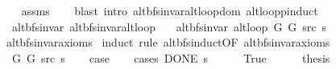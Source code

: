\begin{isabellebody}
%
\isadelimproof
\ \ %
\endisadelimproof
%
\isatagproof
{}\isamarkupfalse%
\ assms\isanewline
\ \ \isamarkupfalse%
\ {\isacharparenleft}{\kern0pt}blast\ intro{\isacharcolon}{\kern0pt}\ alt{\isacharunderscore}{\kern0pt}bfs{\isacharunderscore}{\kern0pt}invar{\isachardot}{\kern0pt}alt{\isacharunderscore}{\kern0pt}loop{\isacharunderscore}{\kern0pt}dom\ alt{\isacharunderscore}{\kern0pt}loop{\isachardot}{\kern0pt}pinduct{\isacharparenright}{\kern0pt}%
\endisatagproof
{\isafoldproof}%
%
\isadelimproof
%
\endisadelimproof
%
\isadelimdocument
%
\endisadelimdocument
%
\isatagdocument
%
\isamarkupsubsection{%
}
\isamarkuptrue%
%
\endisatagdocument
{\isafolddocument}%
%
\isadelimdocument
%
\endisadelimdocument
{}\isamarkupfalse%
\ {\isacharparenleft}{\kern0pt}\ alt{\isacharunderscore}{\kern0pt}bfs{\isacharunderscore}{\kern0pt}invar{\isacharparenright}{\kern0pt}\ alt{\isacharunderscore}{\kern0pt}bfs{\isacharunderscore}{\kern0pt}invar{\isacharunderscore}{\kern0pt}alt{\isacharunderscore}{\kern0pt}loop{\isacharcolon}{\kern0pt}\isanewline
\ \ \ {\isachardoublequoteopen}alt{\isacharunderscore}{\kern0pt}bfs{\isacharunderscore}{\kern0pt}invar{\isacharprime}{\kern0pt}{\isacharprime}{\kern0pt}\ {\isacharparenleft}{\kern0pt}alt{\isacharunderscore}{\kern0pt}loop\ G{}\ G{}\ src\ s{\isacharparenright}{\kern0pt}{\isachardoublequoteclose}\isanewline
%
\isadelimproof
\ \ %
\endisadelimproof
%
\isatagproof
{}\isamarkupfalse%
\ alt{\isacharunderscore}{\kern0pt}bfs{\isacharunderscore}{\kern0pt}invar{\isacharunderscore}{\kern0pt}axioms\isanewline
{}\isamarkupfalse%
\ {\isacharparenleft}{\kern0pt}induct\ rule{\isacharcolon}{\kern0pt}\ alt{\isacharunderscore}{\kern0pt}bfs{\isacharunderscore}{\kern0pt}induct{\isacharbrackleft}{\kern0pt}OF\ alt{\isacharunderscore}{\kern0pt}bfs{\isacharunderscore}{\kern0pt}invar{\isacharunderscore}{\kern0pt}axioms{\isacharbrackright}{\kern0pt}{\isacharparenright}{\kern0pt}\isanewline
\ \ \isamarkupfalse%
\ {\isacharparenleft}{\kern0pt}{}\ G{}\ G{}\ src\ s{\isacharparenright}{\kern0pt}\isanewline
\ \ \isamarkupfalse%
\ {\isacharquery}{\kern0pt}case\isanewline
\ \ \isamarkupfalse%
\ {\isacharparenleft}{\kern0pt}cases\ {\isachardoublequoteopen}DONE\ s{\isachardoublequoteclose}{\isacharparenright}{\kern0pt}\isanewline
\ \ \ \ \isamarkupfalse%
\ True\isanewline
\ \ \ \ \isamarkupfalse%
\ {\isacharquery}{\kern0pt}thesis\isanewline

\end{isabellebody}
